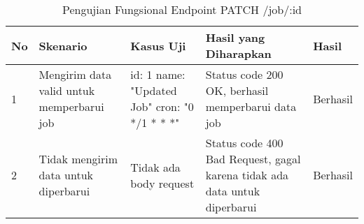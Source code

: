 \begin{table}[H]
    \centering
    \begin{tabular}{|p{0.5cm}|p{3cm}|p{5cm}|p{5cm}|p{1.5cm}|}
        \hline
        \rowcolor[HTML]{DAE8FC} 
        \textbf{No} & \textbf{Skenario} & \textbf{Kasus Uji} & \textbf{Hasil yang Diharapkan} & \textbf{Hasil} \\ \hline
        1 & Mengirim data valid untuk memperbarui job & 
        id: 1 \newline name: "Updated Job" \newline cron: "0 */1 * * *" & 
        Status code 200 OK, berhasil memperbarui data job & 
        Berhasil \\ \hline
        2 & Tidak mengirim data untuk diperbarui & 
        Tidak ada body request & 
        Status code 400 Bad Request, gagal karena tidak ada data untuk diperbarui & 
        Berhasil \\ \hline
    \end{tabular}
    \caption{Pengujian Fungsional Endpoint PATCH /job/:id}
    \label{tab:job_patch_testing}
\end{table}
